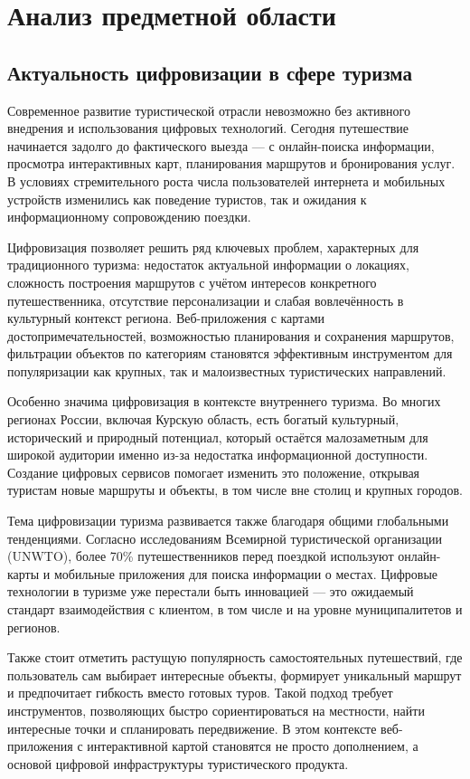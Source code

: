 \section{Анализ предметной области}
\subsection{Актуальность цифровизации в сфере туризма}

Современное развитие туристической отрасли невозможно без активного внедрения и использования цифровых технологий. Сегодня путешествие начинается задолго до фактического выезда — с онлайн-поиска информации, просмотра интерактивных карт, планирования маршрутов и бронирования услуг. В условиях стремительного роста числа пользователей интернета и мобильных устройств изменились как поведение туристов, так и ожидания к информационному сопровождению поездки.

Цифровизация позволяет решить ряд ключевых проблем, характерных для традиционного туризма: недостаток актуальной информации о локациях, сложность построения маршрутов с учётом интересов конкретного путешественника, отсутствие персонализации и слабая вовлечённость в культурный контекст региона. Веб-приложения с картами достопримечательностей, возможностью планирования и сохранения маршрутов, фильтрации объектов по категориям становятся эффективным инструментом для популяризации как крупных, так и малоизвестных туристических направлений.

Особенно значима цифровизация в контексте внутреннего туризма. Во многих регионах России, включая Курскую область, есть богатый культурный, исторический и природный потенциал, который остаётся малозаметным для широкой аудитории именно из-за недостатка информационной доступности. Создание цифровых сервисов помогает изменить это положение, открывая туристам новые маршруты и объекты, в том числе вне столиц и крупных городов.

Тема цифровизации туризма развивается также благодаря общими глобальными тенденциями. Согласно исследованиям Всемирной туристической организации (UNWTO)\cite{b1}, более 70\% путешественников перед поездкой используют онлайн-карты и мобильные приложения для поиска информации о местах. Цифровые технологии в туризме уже перестали быть инновацией — это ожидаемый стандарт взаимодействия с клиентом, в том числе и на уровне муниципалитетов и регионов.

Также стоит отметить растущую популярность самостоятельных путешествий, где пользователь сам выбирает интересные объекты, формирует уникальный маршрут и предпочитает гибкость вместо готовых туров. Такой подход требует инструментов, позволяющих быстро сориентироваться на местности, найти интересные точки и спланировать передвижение. В этом контексте веб-приложения с интерактивной картой становятся не просто дополнением, а основой цифровой инфраструктуры туристического продукта.

